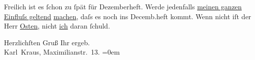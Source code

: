 \pstart
           Freilich ist es{ }ſchon zu{ }ſpät für Dezemberheft. Werde jedenfalls \uline{meinen ganzen Einfluſs geltend}{ }\uline{machen}, daſs es noch ins Decemb.heft kommt. Wenn
               nicht iſt der Herr \uline{Osten}, nicht \uline{ich} daran{ }ſchuld.\pend
           
\pstart
           Herzlichſten Gruß Ihr ergeb.{\\[\baselineskip]}\spacefill\mbox{Karl Kraus,}{ }Maximilianstr. 13.\pend
           \leftskip=0em{}\endnumbering{}  \newcommand{\dateiname}{L00137}\newcommand{\titel}{Karl Kraus an Arthur Schnitzler, 22. 11. 1892}\newcommand{\editorInnen}{Martin Anton Müller und Gerd-Hermann Susen}
